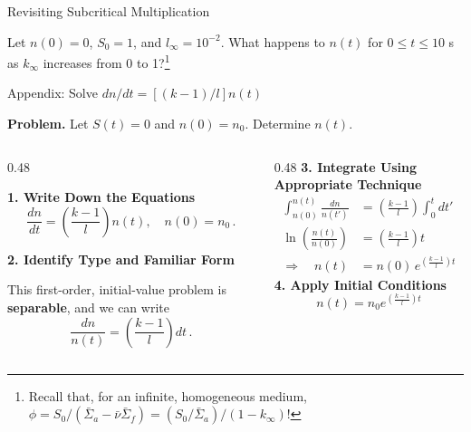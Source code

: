 \documentclass[aspectratio=1610]{beamer}
\begin{document}
\begin{frame}[fragile]{Revisiting Subcritical Multiplication}

Let $n(0) = 0$, $S_0 = 1$, and $l_{\infty} = 10^{-2}$.  What happens to $n(t)$ for $0 \leq t \leq 10$ s as $k_{\infty}$ increases from 0 to 1?\footnote{Recall that, for an infinite, homogeneous medium, $\phi = S_0/(\bar{\Sigma}_a-\bar{\nu}\bar{\Sigma}_f) = (S_0/\bar{\Sigma}_a)/(1-k_{\infty})$!}

\resizebox{0.95\textwidth}{!}{}

\end{frame}


\begin{frame}[fragile]{Appendix: Solve $dn/dt = [(k-1)/l]n(t)$}

{\bf Problem.} Let $S(t) = 0$ and $n(0) = n_0$. Determine $n(t)$.

\vfill

\begin{columns}[T]
  \begin{column}{0.48\textwidth}
  {\small
  {\bf 1. Write Down the Equations}  
  \begin{equation*}
   \frac{dn}{dt} =
    \left(\frac{k - 1}{l}\right)n(t),
    \quad n(0) = n_0 \, .
  \end{equation*}
  
  \vspace{0.25cm}
  
  {\bf 2. Identify Type and Familiar Form}  \\
  \vspace{0.25cm}

  This first-order, initial-value problem is {\bf separable}, and we can write
  \begin{equation*}
     \frac{dn}{n(t)} =
     \left(\frac{k - 1}{l}\right) dt \, .
  \end{equation*}
  }
  \end{column}
  \begin{column}{0.48\textwidth}
  {\small
  {\bf 3. Integrate Using Appropriate Technique}
  \begin{align*}
    \int^{n(t)}_{n(0)} \frac{dn}{n(t')} &=
     \left(\frac{k - 1}{l}\right)
     \int^{t}_{0} dt' \\[4pt]
    \ln\!\left(\frac{n(t)}{n(0)}\right)
      &= \left(\frac{k - 1}{l}\right)t \\[4pt]
    \Rightarrow \quad n(t)
      &= n(0)\, e^{\left(\displaystyle\frac{k - 1}{l}\right)t}
  \end{align*}
  {\bf 4. Apply Initial Conditions}
  \begin{equation*}
    \boxed{ n(t)  =  n_0 e^{\left ( \displaystyle\frac{k - 1}{l}  \right ) t} }
  \end{equation*}
  }
  \end{column}
\end{columns}

\end{frame}
\end{document}
